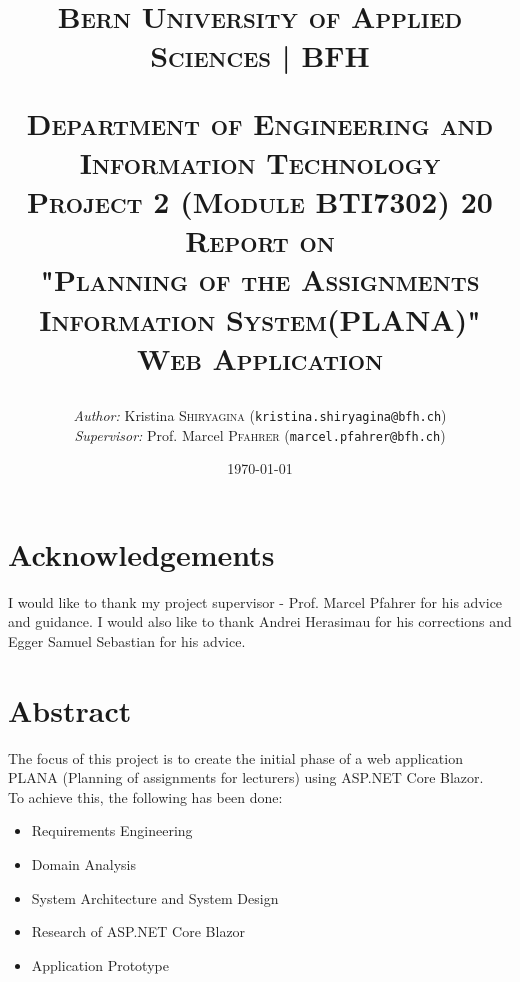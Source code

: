 \documentclass{scrartcl}
\begin{document}
\begin{titlepage}


\title{\textsc{\LARGE Bern University of Applied Sciences | BFH }\\[1cm]
\begin{center}
\end{center}
\textsc{\small Department of Engineering and Information Technology}\\
\textsc{\small Project 2 (Module BTI7302) 20}\\[1cm]
\textsc{\small Report on  }\\
\textsc{"Planning of the Assignments Information System(PLANA)" Web Application}}
\date{\today}   %
\author{\textit{Author: }Kristina \textsc{Shiryagina} (\texttt{kristina.shiryagina@bfh.ch}) \\
 \textit{Supervisor: } Prof. Marcel \textsc{Pfahrer}  (\texttt{marcel.pfahrer@bfh.ch})\\
 }
\maketitle	

\newpage


	
\tableofcontents
\clearpage
\end{titlepage}

\setcounter{secnumdepth}{-2}%



\section{Acknowledgements}
I would like to thank my project supervisor - Prof. Marcel Pfahrer for his advice and guidance. 
I would also like to thank Andrei Herasimau for his corrections and Egger Samuel Sebastian for his advice.


\section{Abstract}
The focus of this project is to create the initial phase of a web application PLANA (Planning of assignments for lecturers) using ASP.NET Core Blazor.\\


To achieve this, the following has been done:
\begin{itemize}
\item Requirements Engineering
\item Domain Analysis
\item System Architecture and System Design
\item Research of  ASP.NET Core Blazor
\item Application Prototype
\end{itemize}
\end{document}
